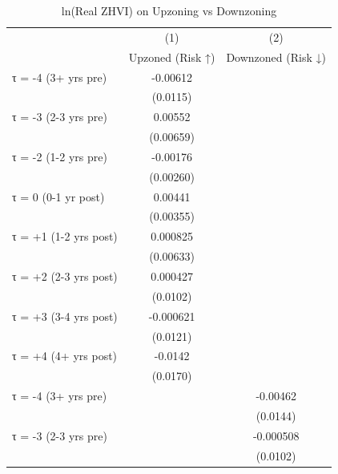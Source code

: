 \begin{table}[htbp]\centering
\def\sym#1{\ifmmode^{#1}\else\(^{#1}\)\fi}
\caption{ln(Real ZHVI) on Upzoning vs Downzoning}
\begin{tabular}{l*{2}{c}}
\hline\hline
                    &\multicolumn{1}{c}{(1)}&\multicolumn{1}{c}{(2)}\\
                    &\multicolumn{1}{c}{Upzoned (Risk ↑)}&\multicolumn{1}{c}{Downzoned (Risk ↓)}\\
\hline
τ = -4 (3+ yrs pre) &    -0.00612         &                     \\
                    &    (0.0115)         &                     \\
[1em]
τ = -3 (2-3 yrs pre)&     0.00552         &                     \\
                    &   (0.00659)         &                     \\
[1em]
τ = -2 (1-2 yrs pre)&    -0.00176         &                     \\
                    &   (0.00260)         &                     \\
[1em]
τ = 0 (0-1 yr post) &     0.00441         &                     \\
                    &   (0.00355)         &                     \\
[1em]
τ = +1 (1-2 yrs post)&    0.000825         &                     \\
                    &   (0.00633)         &                     \\
[1em]
τ = +2 (2-3 yrs post)&    0.000427         &                     \\
                    &    (0.0102)         &                     \\
[1em]
τ = +3 (3-4 yrs post)&   -0.000621         &                     \\
                    &    (0.0121)         &                     \\
[1em]
τ = +4 (4+ yrs post)&     -0.0142         &                     \\
                    &    (0.0170)         &                     \\
[1em]
τ = -4 (3+ yrs pre) &                     &    -0.00462         \\
                    &                     &    (0.0144)         \\
[1em]
τ = -3 (2-3 yrs pre)&                     &   -0.000508         \\
                    &                     &    (0.0102)         \\

\end{tabular}
\end{table}
